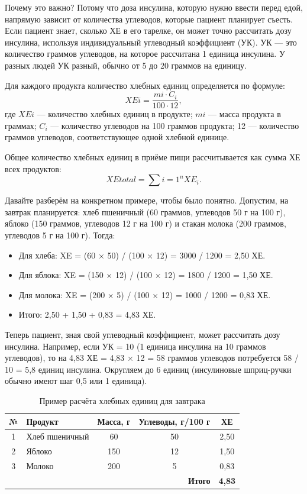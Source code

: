 \documentclass[14pt, a4paper]{extarticle}
\begin{document}
\medskip
\noindent Почему это важно? Потому что доза инсулина, которую нужно ввести перед едой, напрямую зависит от количества углеводов, которые пациент планирует съесть. Если пациент знает, сколько ХЕ в его тарелке, он может точно рассчитать дозу инсулина, используя индивидуальный углеводный коэффициент (УК). УК — это количество граммов углеводов, на которое рассчитана 1 единица инсулина. У разных людей УК разный, обычно от 5 до 20 граммов на единицу.

\medskip
\noindent Для каждого продукта количество хлебных единиц определяется по формуле:
\begin{equation}
XEi = \frac{mi \cdot C_i}{100 \cdot 12},
\end{equation}
где $XEi$ — количество хлебных единиц в продукте; $mi$ — масса продукта в граммах; $C_i$ — количество углеводов на 100 граммов продукта; 12 — количество граммов углеводов, соответствующее одной хлебной единице.

\medskip
\noindent Общее количество хлебных единиц в приёме пищи рассчитывается как сумма ХЕ всех продуктов:
\begin{equation}
XE{total}=\sum{i=1}^{n} XE_i.
\end{equation}

\medskip
\noindent Давайте разберём на конкретном примере, чтобы было понятно. Допустим, на завтрак планируется: хлеб пшеничный (60 граммов, углеводов 50 г на 100 г), яблоко (150 граммов, углеводов 12 г на 100 г) и стакан молока (200 граммов, углеводов 5 г на 100 г). Тогда:

\begin{itemize}
\item Для хлеба: XE = (60 × 50) / (100 × 12) = 3000 / 1200 = 2,50 ХЕ.
\item Для яблока: XE = (150 × 12) / (100 × 12) = 1800 / 1200 = 1,50 ХЕ.
\item Для молока: XE = (200 × 5) / (100 × 12) = 1000 / 1200 = 0,83 ХЕ.
\item Итого: 2,50 + 1,50 + 0,83 = 4,83 ХЕ.
\end{itemize}

\noindent Теперь пациент, зная свой углеводный коэффициент, может рассчитать дозу инсулина. Например, если УК = 10 (1 единица инсулина на 10 граммов углеводов), то на 4,83 ХЕ = 4,83 × 12 = 58 граммов углеводов потребуется 58 / 10 = 5,8 единиц инсулина. Округляем до 6 единиц (инсулиновые шприц-ручки обычно имеют шаг 0,5 или 1 единица).

\begin{longtable}{|c|p{}|c|c|c|}
\caption{Пример расчёта хлебных единиц для завтрака}\\
\hline
\textbf{№} & \textbf{Продукт} & \textbf{Масса, г} & \textbf{Углеводы, г/100 г} & \textbf{ХЕ} \\
\hline
1 & Хлеб пшеничный & 60 & 50 & 2{,}50 \\
\hline
2 & Яблоко & 150 & 12 & 1{,}50 \\
\hline
3 & Молоко & 200 & 5 & 0{,}83 \\
\hline
\multicolumn{4}{|r|}{\textbf{Итого}} & \textbf{4{,}83} \\
\hline
\end{longtable}
\end{document}
